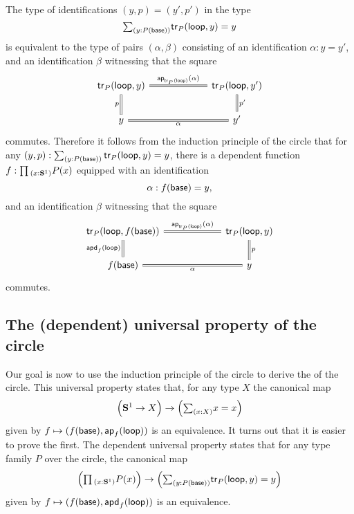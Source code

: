 \begin{rmk}\label{rmk:circle-induction}
  The type of identifications $(y,p)=(y',p')$ in the type
  \begin{equation*}
    \sm{y:P(\base)}\tr_P(\lloop,y)=y
  \end{equation*}
  is equivalent to the type of pairs $(\alpha,\beta)$ consisting of an identification $\alpha:y=y'$, and an identification $\beta$ witnessing that the square
  \begin{equation*}
    \begin{tikzcd}[column sep=6em]
      \tr_P(\lloop,y) \arrow[d,equals,swap,"p"] \arrow[r,equals,"\ap{\tr_P(\lloop)}{\alpha}"] & \tr_P(\lloop,y') \arrow[d,equals,"{p'}"] \\
      y \arrow[r,equals,swap,"\alpha"] & y'
    \end{tikzcd}
  \end{equation*}
  commutes. Therefore it follows from the induction principle of the circle that for any $(y,p):\sm{y:P(\base)}\tr_P(\lloop,y)=y$, there is a dependent function $f:\prd{x:\sphere{1}}P(x)$ equipped with an identification
  \begin{equation*}
    \alpha : f(\mathsf{base})=y,
  \end{equation*}
  and an identification $\beta$ witnessing that the square
  \begin{equation*}
    \begin{tikzcd}[column sep=6em]
      \tr_P(\lloop,f(\base)) \arrow[d,equals,swap,"{\apd{f}{\lloop}}"] \arrow[r,equals,"\ap{\tr_P(\lloop)}{\alpha}"] & \tr_P(\lloop,y) \arrow[d,equals,"{p}"] \\
      f(\base) \arrow[r,equals,swap,"\alpha"] & y
    \end{tikzcd}
  \end{equation*}
  commutes.  
\end{rmk}

\subsection{The (dependent) universal property of the circle}

Our goal is now to use the induction principle of the circle to derive the  of the circle. This universal property states that, for any type $X$ the canonical map
\begin{equation*}
  \Big(\sphere{1}\to X\Big)\to\Big(\sm{x:X}x=x\Big)
\end{equation*}
given by $f\mapsto(f(\mathsf{base}),\mathsf{ap}_{f}({\mathsf{loop}}))$ is an equivalence. It turns out that it is easier to prove the  first. The dependent universal property states that for any type family $P$ over the circle, the canonical map
\begin{equation*}
  \Big(\prd{x:\sphere{1}}P(x)\Big)\to\Big(\sm{y:P(\base)}\tr_P(\lloop,y)=y\Big)
\end{equation*}
given by $f\mapsto(f(\mathsf{base}),\mathsf{apd}_{f}\mathopen{}\left(\mathsf{loop}\right)\mathclose{})$ is an equivalence.

